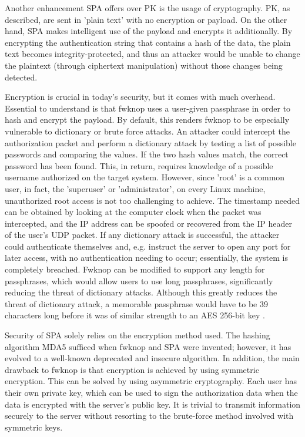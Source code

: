Another enhancement SPA offers over PK is the usage of cryptography. PK, as described, are sent in 'plain text' with no encryption or payload. On the other hand, SPA makes intelligent use of the payload and encrypts it additionally. By encrypting the authentication string that contains a hash of the data, the plain text becomes integrity-protected, and thus an attacker would be unable to change the plaintext (through ciphertext manipulation) without those changes being detected.  \par 
Encryption is crucial in today's security, but it comes with much overhead. Essential to understand is that fwknop uses a user-given passphrase in order to hash and encrypt the payload. By default, this renders fwknop to be especially vulnerable to dictionary or brute force attacks. An attacker could intercept the authorization packet and perform a dictionary attack by testing a list of possible passwords and comparing the values.  If the two hash values match, the correct password has been found.  This, in return, requires knowledge of a possible username authorized on the target system. However, since 'root' is a common user, in fact, the 'superuser' or 'administrator', on every Linux machine, unauthorized root access is not too challenging to achieve.  The timestamp needed can be obtained by looking at the computer clock when the packet was intercepted,  and the IP address can be spoofed or recovered from the IP header of the user's UDP packet.   If any dictionary attack is successful, the attacker could authenticate themselves and, e.g. instruct the server to open any port for later access, with no authentication needing to occur; essentially, the system is completely breached. Fwknop can be modified to support any length for passphrases, which would allow users to use long passphrases, significantly reducing the threat of dictionary attacks.  Although this greatly reduces the threat of dictionary attack, a memorable passphrase would have to be 39 characters long before it was of similar strength to an AES 256-bit key \cite{jeanquier}.\par

Security of SPA solely relies on the encryption method used. The hashing algorithm MDA5 sufficed when fwknop and SPA were invented; however, it has evolved to a well-known deprecated and insecure algorithm. In addition, the main drawback to fwknop is that encryption is achieved by using symmetric encryption. This can be solved by using asymmetric cryptography.  Each user has their own private key, which can be used to sign the authorization data when the data is encrypted with the server's public key.  It is trivial to transmit information securely to the server without resorting to the brute-force method involved with symmetric keys.\par

